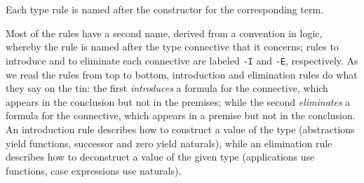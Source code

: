 \begin{fence}
\begin{code}
\AgdaSpace{}%
\AgdaSpace{}%
\AgdaSpace{}%
\AgdaSpace{}%
\<%
\\
\>[.][@{}l@{}]\<[1760I]%
\>[6]\AgdaComment{-------------------------------------}\<%
\\
%
\>[4]\AgdaSpace{}%
\AgdaSpace{}%
\AgdaSpace{}%
\AgdaSpace{}%
\AgdaSpace{}%
\AgdaOperator{\AgdaInductiveConstructor{[zero⇒}}\AgdaSpace{}%
\AgdaSpace{}%
\AgdaSpace{}%
\AgdaSpace{}%
\AgdaSpace{}%
\AgdaSpace{}%
\AgdaOperator{\AgdaInductiveConstructor{]}}\AgdaSpace{}%
\AgdaSpace{}%
\<%
\\
%
\\[\AgdaEmptyExtraSkip]%
%
\>[2]\AgdaSpace{}%
\AgdaSymbol{:}\AgdaSpace{}%
\AgdaSpace{}%
\AgdaSymbol{\{}\AgdaSpace{}%
\AgdaSpace{}%
\AgdaSpace{}%
\AgdaSymbol{\}}\<%
\\
\>[2][@{}l@{\AgdaIndent{0}}]%
\>[4]%
\>[1788I]\AgdaSpace{}%
\AgdaOperator{\AgdaInductiveConstructor{,}}\AgdaSpace{}%
\AgdaSpace{}%
\AgdaSpace{}%
\AgdaSpace{}%
\AgdaSpace{}%
\AgdaSpace{}%
\AgdaSpace{}%
\<%
\\
\>[.][@{}l@{}]\<[1788I]%
\>[6]\AgdaComment{-----------------}\<%
\\
%
\>[4]\AgdaSpace{}%
\AgdaSpace{}%
\AgdaSpace{}%
\AgdaSpace{}%
\AgdaSpace{}%
\AgdaSpace{}%
\AgdaSpace{}%
\AgdaSpace{}%
\<%
\end{code}
\end{fence}

Each type rule is named after the constructor for the corresponding
term.

Most of the rules have a second name, derived from a convention in
logic, whereby the rule is named after the type connective that it
concerns; rules to introduce and to eliminate each connective are
labeled \texttt{-I} and \texttt{-E}, respectively. As we read the rules
from top to bottom, introduction and elimination rules do what they say
on the tin: the first \emph{introduces} a formula for the connective,
which appears in the conclusion but not in the premises; while the
second \emph{eliminates} a formula for the connective, which appears in
a premise but not in the conclusion. An introduction rule describes how
to construct a value of the type (abstractions yield functions,
successor and zero yield naturals), while an elimination rule describes
how to deconstruct a value of the given type (applications use
functions, case expressions use naturals).

